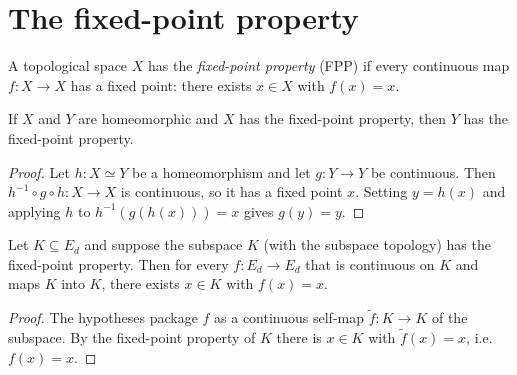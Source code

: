 %
%
%



\section{The fixed-point property}

\begin{definition}
    \label{def:fpp}
    \leanok
    A topological space $X$ has the \emph{fixed-point property} (FPP) if every
    continuous map $f : X \to X$ has a fixed point: there exists $x \in X$ with
    $f(x) = x$.
\end{definition}

\begin{lemma}
    \label{lem:fpp-homeo}
    \leanok
    If $X$ and $Y$ are homeomorphic and $X$ has the fixed-point property, then
    $Y$ has the fixed-point property.
\end{lemma}
\begin{proof}
    Let $h : X \simeq Y$ be a homeomorphism and let $g : Y \to Y$ be continuous.
    Then $h^{-1} \circ g \circ h : X \to X$ is continuous, so it has a fixed
    point $x$. Setting $y = h(x)$ and applying $h$ to $h^{-1}(g(h(x))) = x$ gives
    $g(y) = y$.
\end{proof}

\begin{lemma}
    \label{lem:fpp-ambient}
    \leanok
    Let $K \subseteq E_d$ and suppose the subspace $K$ (with the subspace
    topology) has the fixed-point property. Then for every $f : E_d \to E_d$
    that is continuous on $K$ and maps $K$ into $K$, there exists $x \in K$ with
    $f(x) = x$.
\end{lemma}
\begin{proof}
    The hypotheses package $f$ as a continuous self-map $\tilde f : K \to K$ of
    the subspace. By the fixed-point property of $K$ there is $x \in K$ with
    $\tilde f(x) = x$, i.e.\ $f(x) = x$.
\end{proof}

